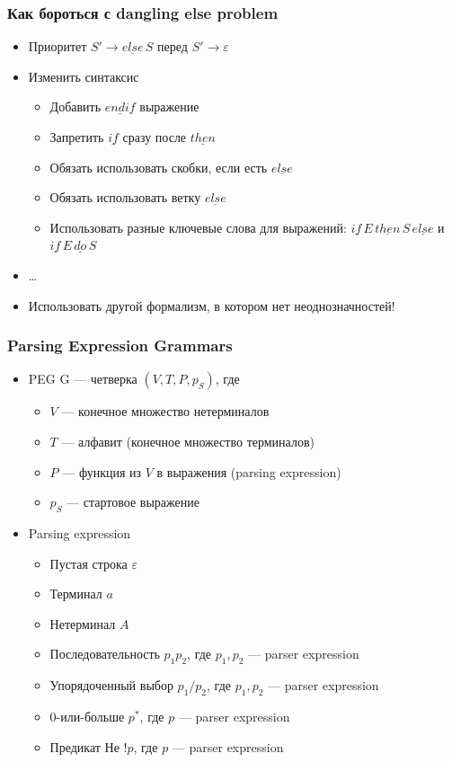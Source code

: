 \documentclass{beamer}
\begin{document}
\begin{frame}[fragile]
  \transwipe[direction=90]
  \frametitle{Как бороться с dangling else problem}
  \begin{itemize}
    \item Приоритет $S' \rightarrow \underline{else} \, S$ перед $S' \rightarrow \varepsilon$
    \item Изменить синтаксис
    \begin{itemize}
      \item Добавить $\underline{endif}$ выражение
      \item Запретить $\underline{if}$ сразу после $\underline{then}$
      \item Обязать использовать скобки, если есть $\underline{else}$
      \item Обязать использовать ветку $\underline{else}$
      \item Использовать разные ключевые слова для выражений: $\underline{if} \, E \, \underline{then} \, S \, \underline{else}$ и $\underline{if} \, E \, \underline{do} \, S$
    \end{itemize}
    \item \dots \pause
    \item Использовать другой формализм, в котором нет неоднозначностей!
  \end{itemize}
\end{frame}

\begin{frame}[fragile]
  \transwipe[direction=90]
  \frametitle{Parsing Expression Grammars}
\begin{itemize}
  \item PEG G --- четверка $(V, T, P, p_S)$, где 
    \begin{itemize}
      \item $V$ --- конечное множество нетерминалов
      \item $T$ --- алфавит (конечное множество терминалов) 
      \item $P$ --- функция из $V$ в выражения (parsing expression) 
      \item $p_S$ --- стартовое выражение
    \end{itemize}
\end{itemize}
\pause
\begin{itemize}
  \item Parsing expression
  \begin{itemize}
    \item Пустая строка $\varepsilon$
    \item Терминал $a$
    \item Нетерминал $A$
    \item Последовательность $p_1 p_2$, где $p_1, p_2$ --- parser expression
    \item Упорядоченный выбор $p_1 / p_2$, где $p_1, p_2$ --- parser expression
    \item 0-или-больше $p^*$, где $p$ --- parser expression
    \item Предикат Не $!p$, где $p$ --- parser expression
  \end{itemize}
\end{itemize}
\end{frame}
\end{document}
